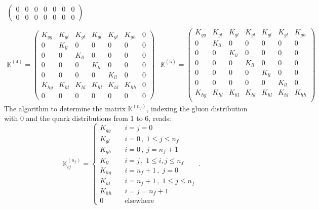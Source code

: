 \documentclass[10pt,a4paper]{article}
\begin{document}
\begin{equation}
\begin{array}{ll}
\begin{pmatrix}
0 & 0 & 0  & 0  & 0  & 0  & 0 \\
0 & 0 & 0  & 0  & 0  & 0  & 0
\end{pmatrix}
\\ \\
\mathbb{K}^{(4)} = 
\begin{pmatrix}
K_{gg} & K_{gl} & K_{gl} & K_{gl} & K_{gl} & K_{gh} & 0  \\
0 & K_{ll} & 0 & 0  & 0  & 0  & 0  \\
0 & 0 & K_{ll} & 0  & 0  & 0  & 0  \\
0 & 0 & 0 & K_{ll} & 0  & 0  & 0  \\
0 & 0 & 0 & 0 & K_{ll}  & 0  & 0  \\
K_{hg} & K_{hl} & K_{hl} & K_{hl} & K_{hl} & K_{hh}  & 0 \\
0 & 0 & 0  & 0  & 0  & 0  & 0
\end{pmatrix}
&
\mathbb{K}^{(5)} = 
\begin{pmatrix}
K_{gg} & K_{gl} & K_{gl} & K_{gl} & K_{gl} & K_{gl} & K_{gh} \\
0 & K_{ll} & 0 & 0 & 0  & 0  & 0  \\
0 & 0 & K_{ll} & 0 & 0  & 0  & 0  \\
0 & 0 & 0 & K_{ll} & 0  & 0  & 0  \\
0 & 0 & 0 & 0 & K_{ll} & 0  & 0  \\
0 & 0 & 0 & 0 & 0 & K_{ll} & 0  \\
K_{hg} & K_{hl} & K_{hl} & K_{hl} & K_{hl} & K_{hl} & K_{hh} \\
\end{pmatrix}
\end{array}
\end{equation}
The algorithm to determine the matrix $\mathbb{K}^{(n_f)}$, indexing
the gluon distribution with 0 and the quark distributions from 1 to 6,
reads:
\begin{equation}\label{eq:algorithm}
\mathbb{K}_{ij}^{(n_f)} =
\left\{
\begin{array}{ll}
K_{gg} & \quad i = j = 0\\
K_{gl} & \quad i = 0\,,\;1\leq j \leq n_f\\
K_{gh} & \quad i = 0\,,\;j = n_f+1\\
K_{ll} & \quad i = j\,,\;1\leq i,j \leq n_f\\
K_{hg} & \quad i = n_f+1\,,\;j = 0\\
K_{hl} & \quad i = n_f+1\,,\;1\leq j \leq n_f\\
K_{hh} & \quad i = j = n_f+1\\
0 & \quad\mbox{elsewhere}
\end{array}
\right.\,.
\end{equation}
\end{document}
